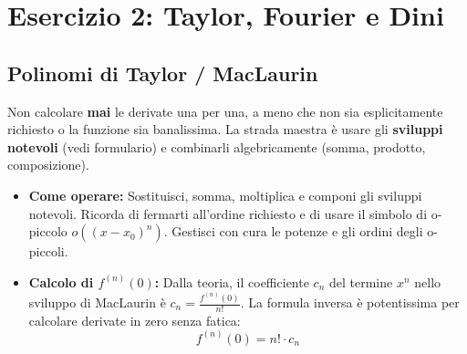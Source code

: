 \documentclass[a4paper, 12pt]{article}
\begin{document}
\section{Esercizio 2: Taylor, Fourier e Dini}

\subsection{Polinomi di Taylor / MacLaurin}
\begin{strategia}
Non calcolare \textbf{mai} le derivate una per una, a meno che non sia esplicitamente richiesto o la funzione sia banalissima. La strada maestra è usare gli \textbf{sviluppi notevoli} (vedi formulario) e combinarli algebricamente (somma, prodotto, composizione).
\end{strategia}
\begin{itemize}
    \item \textbf{Come operare:} Sostituisci, somma, moltiplica e componi gli sviluppi notevoli. Ricorda di fermarti all'ordine richiesto e di usare il simbolo di o-piccolo $o((x-x_0)^n)$. Gestisci con cura le potenze e gli ordini degli o-piccoli.
    \item \textbf{Calcolo di \texorpdfstring{$f^{(n)}(0)$}{f\^(n)(0)}:} Dalla teoria, il coefficiente $c_n$ del termine $x^n$ nello sviluppo di MacLaurin è $c_n = \frac{f^{(n)}(0)}{n!}$. La formula inversa è potentissima per calcolare derivate in zero senza fatica: 
    \[ f^{(n)}(0) = n! \cdot c_n \]
\end{itemize}
\end{document}

